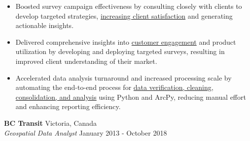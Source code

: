 \documentclass[letterpaper]{article}
\newcommand{\employer}[4]{
        \vspace{3pt}
        \textbf{#1}  %
        \hfill #2\\  %
        \textit{#3}  %
        \hfill #4\\  %
        \vspace{3mm}
    }
\newenvironment{jobtasklist}
        {
            \vspace{-12pt}
            \begin{itemize} \itemsep 0pt
        }{
            \end{itemize}
            \vspace{-3pt}
        }
\newcommand{\impt}[1]{\uline{#1}}
\begin{document}
\begin{jobtasklist}
%
%
%
%

        \item Boosted survey campaign effectiveness by consulting closely with clients to develop targeted
                strategies, \impt{increasing client satisfaction} and generating actionable insights.
        \item Delivered comprehensive insights into \impt{customer engagement} and product utilization by developing
                and deploying targeted surveys, resulting in improved client understanding of their market.
        \item Accelerated data analysis turnaround and increased processing scale by automating the end-to-end process for
                \impt{data verification, cleaning, consolidation, and analysis}
                using Python and ArcPy, reducing manual effort and enhancing reporting efficiency.
\end{jobtasklist}


\employer
    {BC Transit}
    {Victoria, Canada}
    {Geospatial Data Analyst}
    {January 2013 - October 2018}
\end{document}
